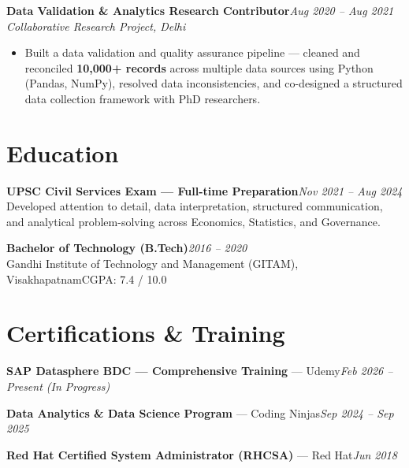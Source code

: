 \documentclass[10pt, letterpaper]{article}
\newcommand{\role}[3]{%
  \vspace{2pt}%
  {\bfseries #1}\hfill{\small\color{muted}\textit{#3}}\\[-2pt]%
  {\small\color{muted}\textit{#2}}%
}
\begin{document}
\role{Data Validation \& Analytics Research Contributor}{Collaborative Research Project, Delhi}{Aug 2020 – Aug 2021}

\begin{itemize}
  \item Built a data validation and quality assurance pipeline — cleaned and reconciled \textbf{10,000+ records} across multiple data sources using Python (Pandas, NumPy), resolved data inconsistencies, and co-designed a structured data collection framework with PhD researchers.
\end{itemize}

\section{Education}

{\bfseries UPSC Civil Services Exam — Full-time Preparation}\hfill{\small\color{muted}\textit{Nov 2021 – Aug 2024}}\\
{\small\color{muted}Developed attention to detail, data interpretation, structured communication, and analytical problem-solving across Economics, Statistics, and Governance.}

\vspace{2pt}
{\bfseries Bachelor of Technology (B.Tech)}\hfill{\small\color{muted}\textit{2016 – 2020}}\\
{\small\color{muted}Gandhi Institute of Technology and Management (GITAM), Visakhapatnam\hfill CGPA: 7.4 / 10.0}

\section{Certifications \& Training}

{\bfseries SAP Datasphere BDC — Comprehensive Training} — Udemy\hfill{\small\color{muted}\textit{Feb 2026 – Present \emph{(In Progress)}}}

\vspace{1pt}
{\bfseries Data Analytics \& Data Science Program} — Coding Ninjas\hfill{\small\color{muted}\textit{Sep 2024 – Sep 2025}}

\vspace{1pt}
{\bfseries Red Hat Certified System Administrator (RHCSA)} — Red Hat\hfill{\small\color{muted}\textit{Jun 2018}}

\end{document}
